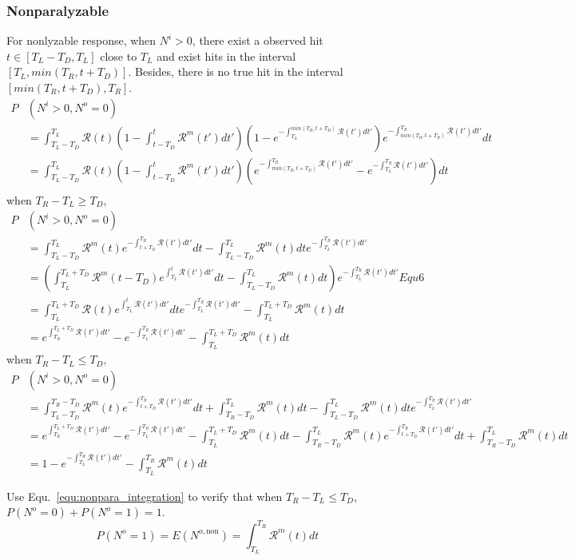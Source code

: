 \subsubsection{Nonparalyzable}
For nonlyzable response, when $N^i>0$, there exist a observed hit $t\in[T_L-T_D,T_L]$ close to $T_L$ and exist hits in the interval $[T_L, min(T_R,t+T_D)]$. Besides, there is no true hit in the interval $[min(T_R,t+T_D),T_R]$.
\begin{equation}
\begin{aligned}
P&(N^i>0,N^o=0)\\
&=\int_{T_L-T_D}^{T_L}{\mathcal{R}(t)\left(1-\int_{t-T_D}^{t}{\mathcal{R}^m(t')dt'}\right)\left(1-e^{-\int_{T_L}^{min(T_R,t+T_D)}{\mathcal{R}(t')dt'}}\right)e^{-\int_{min(T_R,t+T_D)}^{T_R}{\mathcal{R}(t')dt'}}dt}\\
&=\int_{T_L-T_D}^{T_L}{\mathcal{R}(t)\left(1-\int_{t-T_D}^{t}{\mathcal{R}^m(t')dt'}\right)\left(e^{-\int_{min(T_R,t+T_D)}^{T_R}{\mathcal{R}(t')dt'}}-e^{-\int_{T_L}^{T_R}{\mathcal{R}(t')dt'}}\right)dt}\\
\end{aligned}
\end{equation}
when $T_R-T_L\geq T_D$,
\begin{equation}
\begin{aligned}
P&(N^i>0,N^o=0)\\
&=\int_{T_L-T_D}^{T_L}{\mathcal{R}^m(t)e^{-\int_{t+T_D}^{T_R}{\mathcal{R}(t')dt'}}dt}-\int_{T_L-T_D}^{T_L}{\mathcal{R}^m(t)dt}e^{-\int_{T_L}^{T_R}{\mathcal{R}(t')dt'}}\\
&=\left(\int_{T_L}^{T_L+T_D}{\mathcal{R}^m(t-T_D)e^{\int_{T_L}^{t}{\mathcal{R}(t')dt'}}dt}-\int_{T_L-T_D}^{T_L}{\mathcal{R}^m(t)dt}\right)e^{-\int_{T_L}^{T_R}{\mathcal{R}(t')dt'}} Equ6\\
&=\int_{T_L}^{T_L+T_D}{\mathcal{R}(t)e^{\int_{T_L}^{t}{\mathcal{R}(t')dt'}}dt}e^{-\int_{T_L}^{T_R}{\mathcal{R}(t')dt'}} -\int_{T_L}^{T_L+T_D}{\mathcal{R}^m(t)dt}\\
&= e^{\int_{T_R}^{T_L+T_D}{\mathcal{R}(t')dt'}} - e^{-\int_{T_L}^{T_R}{\mathcal{R}(t')dt'}}-\int_{T_L}^{T_L+T_D}{\mathcal{R}^m(t)dt}
\end{aligned}
\end{equation}
when $T_R-T_L\leq T_D$,
\begin{equation}
\begin{aligned}
P&(N^i>0,N^o=0)\\
&=\int_{T_L-T_D}^{T_R-T_D}{\mathcal{R}^m(t)e^{-\int_{t+T_D}^{T_R}{\mathcal{R}(t')dt'}}dt}+\int_{T_R-T_D}^{T_L}{\mathcal{R}^m(t)dt}-\int_{T_L-T_D}^{T_L}{\mathcal{R}^m(t)dt}e^{-\int_{T_L}^{T_R}{\mathcal{R}(t')dt'}}\\
&= e^{\int_{T_R}^{T_L+T_D}{\mathcal{R}(t')dt'}} - e^{-\int_{T_L}^{T_R}{\mathcal{R}(t')dt'}}-\int_{T_L}^{T_L+T_D}{\mathcal{R}^m(t)dt}-\int_{T_R-T_D}^{T_L}{\mathcal{R}^m(t)e^{-\int_{t+T_D}^{T_R}{\mathcal{R}(t')dt'}}dt}+\int_{T_R-T_D}^{T_L}{\mathcal{R}^m(t)dt}\\
&= 1 - e^{-\int_{T_L}^{T_R}{\mathcal{R}(t')dt'}}-\int_{T_L}^{T_R}{\mathcal{R}^m(t)dt}
\end{aligned}
\end{equation}

Use Equ.~\eqref{equ:nonpara_integration} to verify that when $T_R-T_L\leq T_D$, $P(N^o=0)+P(N^o=1)=1$.
\begin{equation}
P(N^o=1)=E(N^{o,\mathrm{non}})=\int_{T_L}^{T_R}{\mathcal{R}^m(t)dt}
\end{equation}
